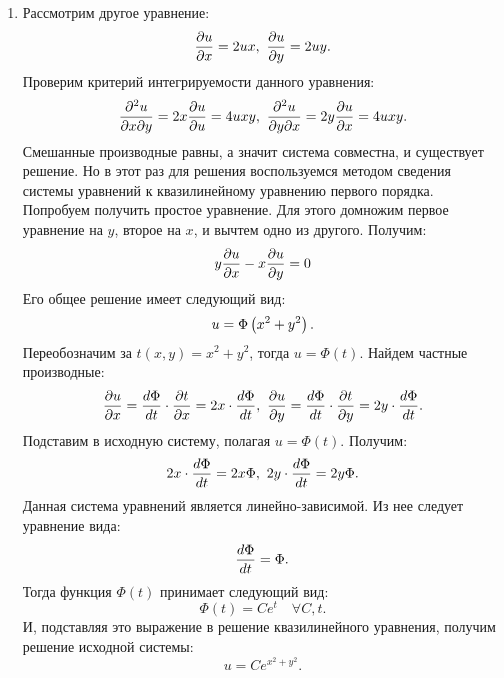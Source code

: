 \begin{enumerate}
			\item Рассмотрим другое уравнение:
				\[ \dfrac{\partial u}{\partial x} = 2ux, ~ \dfrac{\partial u}{\partial y} = 2uy. \]
				Проверим критерий интегрируемости данного уравнения:
				\[ \dfrac{\partial^2 u}{\partial x \partial y} = 2x \dfrac{\partial u}{\partial u} = 4uxy, ~ \dfrac{\partial^2 u}{\partial y \partial x} = 2y \dfrac{\partial u}{\partial x} = 4uxy. \]
				Смешанные производные равны, а значит система совместна, и существует решение. Но в этот раз для решения воспользуемся методом сведения системы уравнений к квазилинейному уравнению первого порядка. Попробуем получить простое уравнение. Для этого домножим первое уравнение на $y$, второе на $x$, и вычтем одно из другого. Получим:
				\[ y \dfrac{\partial u}{\partial x} - x \dfrac{\partial u}{\partial y} = 0 \]
				Его общее решение имеет следующий вид:
				\[ u = \Phi\left( x^2 + y^2 \right). \]
				Переобозначим за $t(x, y) = x^2 + y^2$, тогда $u = \Phi(t)$. Найдем частные производные:
				\[ \dfrac{\partial u}{\partial x} = \dfrac{d \Phi}{d t} \cdot \dfrac{\partial t}{\partial x} = 2x \cdot \dfrac{d \Phi}{d t}, ~ \dfrac{\partial u}{\partial y} = \dfrac{d \Phi}{d t} \cdot \dfrac{\partial t}{\partial y} = 2y \cdot \dfrac{d \Phi}{d t}. \]
				Подставим в исходную систему, полагая $u = \Phi(t)$. Получим:
				\[ 2x \cdot \dfrac{d \Phi}{d t} = 2x \Phi, ~ 2y \cdot \dfrac{d \Phi}{d t} = 2y \Phi. \]
				Данная система уравнений является линейно-зависимой. Из нее следует уравнение вида:
				\[ \dfrac{d \Phi}{d t} = \Phi. \]
				Тогда функция $\Phi(t)$ принимает следующий вид:
				\[ \Phi(t) = C e^{t} \quad \forall C, t. \]
				И, подставляя это выражение в решение квазилинейного уравнения, получим решение исходной системы:
				\[ u = C e^{x^2 + y^2}. \]

		
		\end{enumerate}

